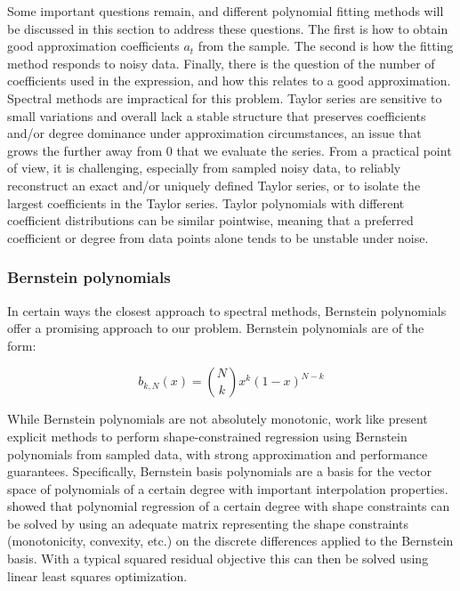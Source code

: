 \documentclass[12pt,a4paper]{article}
\begin{document}
Some important questions remain, and different polynomial fitting methods will be discussed in this section to address these questions. The first is how to obtain good approximation coefficients $a_t$ from the sample. The second is how the fitting method responds to noisy data. Finally, there is the question of the number of coefficients used in the expression, and how this relates to a good approximation.\\

Spectral methods are impractical for this problem. Taylor series are sensitive to small variations and overall lack a stable structure that preserves coefficients and/or degree dominance under approximation circumstances, an issue that grows the further away from 0 that we evaluate the series. From a practical point of view, it is challenging, especially from sampled noisy data, to reliably reconstruct an exact and/or uniquely defined Taylor series, or to isolate the largest coefficients in the Taylor series. Taylor polynomials with different coefficient distributions can be similar pointwise, meaning that a preferred coefficient or degree from data points alone tends to be unstable under noise.\\

\subsubsection{Bernstein polynomials}
\label{bernstein_polynomials}

In certain ways the closest approach to spectral methods, Bernstein polynomials offer a promising approach to our problem. Bernstein polynomials are of the form:

\begin{equation}
b_{k,N}(x) = {N \choose k} x^k (1-x)^{N-k}
\end{equation}

While Bernstein polynomials are not absolutely monotonic, work like \cite{2012_wang_shape_regression_bernstein, 2023_ghosal_shape_regression_bernstein} present explicit methods to perform shape-constrained regression using Bernstein polynomials from sampled data, with strong approximation and performance guarantees. Specifically, Bernstein basis polynomials are a basis for the vector space of polynomials of a certain degree with important interpolation properties. \cite{2012_wang_shape_regression_bernstein} showed that polynomial regression of a certain degree with shape constraints can be solved by using an adequate matrix representing the shape constraints (monotonicity, convexity, etc.) on the discrete differences applied to the Bernstein basis. With a typical squared residual objective this can then be solved using linear least squares optimization.
\end{document}
